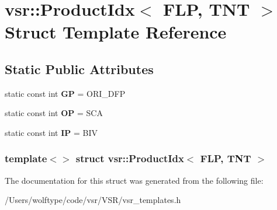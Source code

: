 \hypertarget{structvsr_1_1_product_idx_3_01_f_l_p_00_01_t_n_t_01_4}{\section{vsr\-:\-:Product\-Idx$<$ F\-L\-P, T\-N\-T $>$ Struct Template Reference}
\label{structvsr_1_1_product_idx_3_01_f_l_p_00_01_t_n_t_01_4}
}
\subsection*{Static Public Attributes}
\begin{DoxyCompactItemize}
\item 
\hypertarget{structvsr_1_1_product_idx_3_01_f_l_p_00_01_t_n_t_01_4_a9ee5b799293681197a413b906018ebf4}{static const int {\bfseries G\-P} = O\-R\-I\-\_\-\-D\-F\-P}\label{structvsr_1_1_product_idx_3_01_f_l_p_00_01_t_n_t_01_4_a9ee5b799293681197a413b906018ebf4}

\item 
\hypertarget{structvsr_1_1_product_idx_3_01_f_l_p_00_01_t_n_t_01_4_a18053f4451f6d44c3465278e4efb23ea}{static const int {\bfseries O\-P} = S\-C\-A}\label{structvsr_1_1_product_idx_3_01_f_l_p_00_01_t_n_t_01_4_a18053f4451f6d44c3465278e4efb23ea}

\item 
\hypertarget{structvsr_1_1_product_idx_3_01_f_l_p_00_01_t_n_t_01_4_a07d0205862dd81fbb4ffb5d6e5b577c5}{static const int {\bfseries I\-P} = B\-I\-V}\label{structvsr_1_1_product_idx_3_01_f_l_p_00_01_t_n_t_01_4_a07d0205862dd81fbb4ffb5d6e5b577c5}

\end{DoxyCompactItemize}
\subsubsection*{template$<$$>$ struct vsr\-::\-Product\-Idx$<$ F\-L\-P, T\-N\-T $>$}



The documentation for this struct was generated from the following file\-:\begin{DoxyCompactItemize}
\item 
/\-Users/wolftype/code/vsr/\-V\-S\-R/vsr\-\_\-templates.\-h\end{DoxyCompactItemize}
